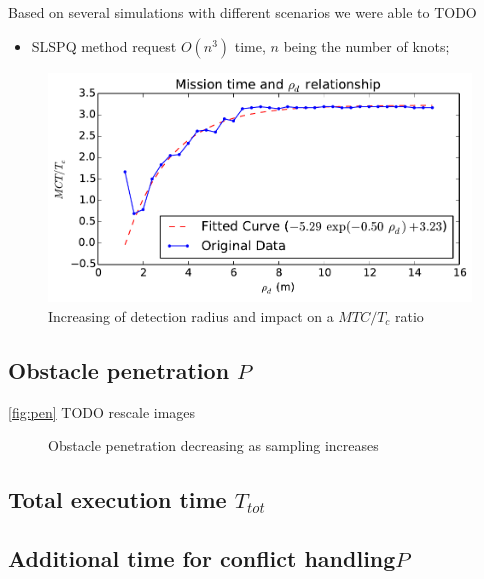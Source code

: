 \documentclass[eprint]{actapoly}
\begin{document}
Based on several simulations with different scenarios we were able to TODO

\begin{itemize}
 \item 
 SLSPQ method request $O(n^3)$ time, $n$ being the number of knots; 
\end{itemize}

\begin{figure}[!h]\centering
  \includegraphics[width=\linewidth]{./images/drho/drho-rmp.pdf} %
  \caption{Increasing of detection radius and impact on a $MTC/T_c$ 
ratio\label{fig:drho}}
\label{fig:res}
\end{figure}

\subsection{Obstacle penetration $P$}

\ref{fig:pen}
TODO rescale images

\begin{figure}[!h]\centering
  \caption{Obstacle penetration decreasing as sampling increases\label{fig:pen}}
\label{fig:res}
\end{figure}




\subsection{Total execution time $T_{tot}$}



\subsection{Additional time for conflict handling$P$}
\end{document}
